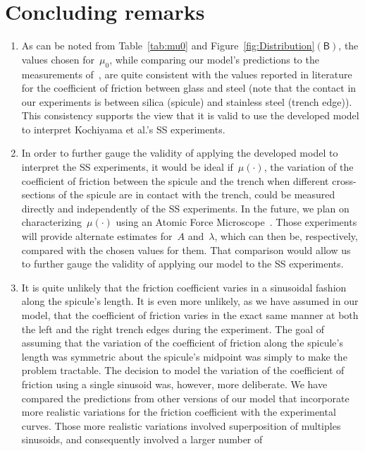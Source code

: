 \documentclass[preprint,10pt,times]{elsarticle}
\numberwithin{equation}{section}
\newcommand{\pr}[1]{\left( #1 \right)}
\newcommand{\subf}[1]{\pr{\textsf{#1}}}
\begin{document}
\section{Concluding remarks\label{sec:Remark}}
\begin{enumerate}
\item As can be noted from Table~\ref{tab:mu0} and Figure~\ref{fig:Distribution}$\subf{B}$,
the values chosen for~$\mu_0$, while comparing our model's predictions
to the measurements of~\cite{Sayaka2021Sawtooth}, are quite
consistent with the values reported in literature for the coefficient
of friction between glass and steel (note that the contact in our
experiments is between silica (spicule) and stainless steel (trench
edge)). This consistency supports the view that it is valid to use
the developed model to interpret Kochiyama et al.'s SS experiments.
\item In order to further gauge the validity of applying the developed model
to interpret the SS experiments, it would be ideal if~$\mu(\cdot)$,
the variation of the coefficient of friction between the spicule and
the trench when different cross-sections of the spicule are in contact
with the trench, could be measured directly and independently of the
SS experiments. In the future, we plan on characterizing~$\mu(\cdot)$
using an Atomic Force Microscope~\cite{kesari2010role,kesari2011effective,deng2019depth}.
Those experiments will provide alternate estimates for~$A$ and~$\lambda$,
which can then be, respectively, compared with the chosen values for
them. That comparison would allow us to further gauge the validity
of applying our model to the SS experiments.
\item It is quite unlikely that the friction coefficient varies in a sinusoidal
fashion along the spicule's length. It is even more unlikely, as we
have assumed in our model, that the coefficient of friction varies
in the exact same manner at both the left and the right trench edges
during the experiment. The goal of assuming that the variation of
the coefficient of friction along the spicule's length was symmetric
about the spicule's midpoint was simply to make the problem tractable.
The decision to model the variation of the coefficient of friction
using a single sinusoid was, however, more deliberate. We have compared
the predictions from other versions of our model that incorporate
more realistic variations for the friction coefficient with the experimental
curves. Those more realistic variations involved superposition of
multiples sinusoids, and consequently involved a larger number of

\end{enumerate}
\end{document}
